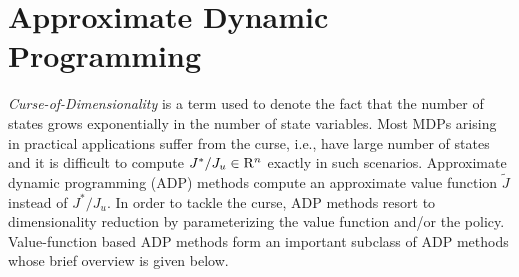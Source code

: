 \section{Approximate Dynamic Programming}
\emph{Curse-of-Dimensionality} is a term used to denote the fact that the number of states grows exponentially in the number of state variables. Most MDPs arising in practical applications suffer from the curse, i.e., have large number of states and it is difficult to compute $J^*/J_u\in \mathrm{R}^n$ exactly in such scenarios. Approximate dynamic programming (ADP) \cite{lspi,lspe,ALP,wang2014approximate} methods compute an approximate value function $\tilde{J}$ instead of $J^*/J_u$. In order to tackle the curse, ADP methods resort to dimensionality reduction by parameterizing the value function and/or the policy. Value-function based ADP methods form an important subclass of ADP methods whose brief overview is given below.
